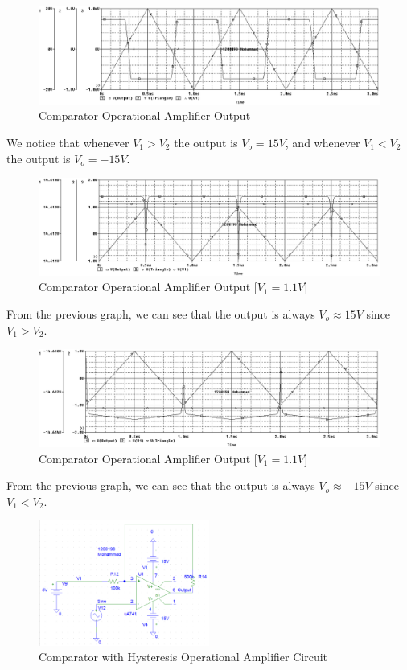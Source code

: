 \documentclass[12pt]{article}
\begin{document}
\begin{figure}[H]
    \centering
    \includegraphics[width=\textwidth]{assets/main/2023-08-20-15-12-14.png}
    \caption{Comparator Operational Amplifier Output}
\end{figure}
We notice that whenever $V_1 > V_2$ the output is $V_o = 15V$, and whenever $V_1 < V_2$ the output is $V_o = -15V$.
\begin{figure}[H]
    \centering
    \includegraphics[width=\textwidth]{assets/main/2023-08-20-15-19-07.png}
    \caption{Comparator Operational Amplifier Output [$V_1 = 1.1V$]}
\end{figure}
From the previous graph, we can see that the output is always $V_o \approx 15V$ since $V_1 > V_2$.
\begin{figure}[H]
    \centering
    \includegraphics[width=\textwidth]{assets/main/2023-08-20-15-24-09.png}
    \caption{Comparator Operational Amplifier Output [$V_1 = 1.1V$]}
\end{figure}
From the previous graph, we can see that the output is always $V_o \approx -15V$ since $V_1 < V_2$.
\begin{figure}[H]
    \centering
    \includegraphics[width=0.5\textwidth]{assets/main/2023-08-20-15-28-53.png}
    \caption{Comparator with Hysteresis Operational Amplifier Circuit}
\end{figure}
\end{document}
